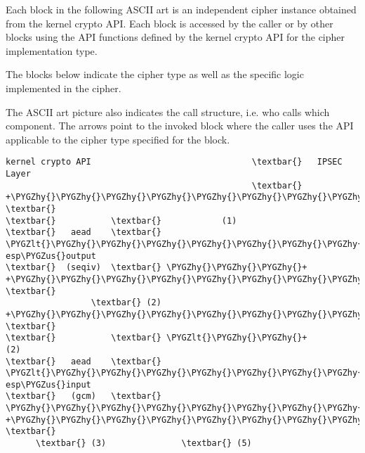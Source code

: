 \documentclass[a4paper,8pt,english]{sphinxmanual}
\def\PYGZus{\char`\_}
\def\PYGZlt{\char`\<}
\def\PYGZhy{\char`\-}
\begin{document}
Each block in the following ASCII art is an independent cipher instance
obtained from the kernel crypto API. Each block is accessed by the
caller or by other blocks using the API functions defined by the kernel
crypto API for the cipher implementation type.

The blocks below indicate the cipher type as well as the specific logic
implemented in the cipher.

The ASCII art picture also indicates the call structure, i.e. who calls
which component. The arrows point to the invoked block where the caller
uses the API applicable to the cipher type specified for the block.

\begin{Verbatim}[commandchars=\\\{\}]
kernel crypto API                                \textbar{}   IPSEC Layer
                                                 \textbar{}
+\PYGZhy{}\PYGZhy{}\PYGZhy{}\PYGZhy{}\PYGZhy{}\PYGZhy{}\PYGZhy{}\PYGZhy{}\PYGZhy{}\PYGZhy{}\PYGZhy{}+                                    \textbar{}
\textbar{}           \textbar{}            (1)
\textbar{}   aead    \textbar{} \PYGZlt{}\PYGZhy{}\PYGZhy{}\PYGZhy{}\PYGZhy{}\PYGZhy{}\PYGZhy{}\PYGZhy{}\PYGZhy{}\PYGZhy{}\PYGZhy{}\PYGZhy{}\PYGZhy{}\PYGZhy{}\PYGZhy{}\PYGZhy{}\PYGZhy{}\PYGZhy{}\PYGZhy{}\PYGZhy{}\PYGZhy{}\PYGZhy{}\PYGZhy{}\PYGZhy{}\PYGZhy{}\PYGZhy{}\PYGZhy{}\PYGZhy{}\PYGZhy{}\PYGZhy{}\PYGZhy{}\PYGZhy{}\PYGZhy{}\PYGZhy{}\PYGZhy{}\PYGZhy{}  esp\PYGZus{}output
\textbar{}  (seqiv)  \textbar{} \PYGZhy{}\PYGZhy{}\PYGZhy{}+
+\PYGZhy{}\PYGZhy{}\PYGZhy{}\PYGZhy{}\PYGZhy{}\PYGZhy{}\PYGZhy{}\PYGZhy{}\PYGZhy{}\PYGZhy{}\PYGZhy{}+    \textbar{}
                 \textbar{} (2)
+\PYGZhy{}\PYGZhy{}\PYGZhy{}\PYGZhy{}\PYGZhy{}\PYGZhy{}\PYGZhy{}\PYGZhy{}\PYGZhy{}\PYGZhy{}\PYGZhy{}+    \textbar{}
\textbar{}           \textbar{} \PYGZlt{}\PYGZhy{}\PYGZhy{}+                (2)
\textbar{}   aead    \textbar{} \PYGZlt{}\PYGZhy{}\PYGZhy{}\PYGZhy{}\PYGZhy{}\PYGZhy{}\PYGZhy{}\PYGZhy{}\PYGZhy{}\PYGZhy{}\PYGZhy{}\PYGZhy{}\PYGZhy{}\PYGZhy{}\PYGZhy{}\PYGZhy{}\PYGZhy{}\PYGZhy{}\PYGZhy{}\PYGZhy{}\PYGZhy{}\PYGZhy{}\PYGZhy{}\PYGZhy{}\PYGZhy{}\PYGZhy{}\PYGZhy{}\PYGZhy{}\PYGZhy{}\PYGZhy{}\PYGZhy{}\PYGZhy{}\PYGZhy{}\PYGZhy{}\PYGZhy{}\PYGZhy{}  esp\PYGZus{}input
\textbar{}   (gcm)   \textbar{} \PYGZhy{}\PYGZhy{}\PYGZhy{}\PYGZhy{}\PYGZhy{}\PYGZhy{}\PYGZhy{}\PYGZhy{}\PYGZhy{}\PYGZhy{}\PYGZhy{}\PYGZhy{}+
+\PYGZhy{}\PYGZhy{}\PYGZhy{}\PYGZhy{}\PYGZhy{}\PYGZhy{}\PYGZhy{}\PYGZhy{}\PYGZhy{}\PYGZhy{}\PYGZhy{}+             \textbar{}
      \textbar{} (3)               \textbar{} (5)

\end{Verbatim}
\end{document}
